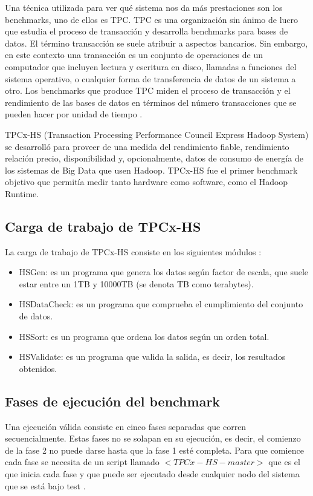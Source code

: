 \documentclass[10pt]{article}
\begin{document}
	Una técnica utilizada para ver qué sistema nos da más prestaciones son los benchmarks, uno de ellos es TPC. TPC es una organización sin ánimo de lucro que estudia el proceso de transacción y desarrolla benchmarks para bases de datos. El término transacción se suele atribuir a aspectos bancarios. Sin embargo, en este contexto una transacción es un conjunto de operaciones de un computador que incluyen lectura y escritura en disco, llamadas a funciones del sistema operativo, o cualquier forma de transferencia de datos de un sistema a otro. Los benchmarks que produce TPC miden el proceso de transacción y el rendimiento de las bases de datos en términos del número transacciones que se pueden hacer por unidad de tiempo \cite{intro-tpc}.
	
	TPCx-HS (Transaction Processing Performance Council Express Hadoop System) se desarrolló para proveer de una medida del rendimiento fiable, rendimiento relación precio, disponibilidad y, opcionalmente, datos de consumo de energía de los sistemas de Big Data que usen Hadoop. TPCx-HS fue el primer benchmark objetivo que permitía medir tanto hardware como software, como el Hadoop Runtime. \cite{info-tpc}
	
	\subsection{Carga de trabajo de TPCx-HS}
	
		La carga de trabajo de TPCx-HS consiste en los siguientes módulos \cite{tpcxhs}:
		
		\begin{itemize}
			\item HSGen: es un programa que genera los datos según factor de escala, que suele estar entre un 1TB y 10000TB (se denota TB como terabytes).
			\item HSDataCheck: es un programa que comprueba el cumplimiento del conjunto de datos.
			\item HSSort: es un programa que ordena los datos según un orden total.
			\item HSValidate: es un programa que valida la salida, es decir, los resultados obtenidos.
		\end{itemize}
	
	\subsection{Fases de ejecución del benchmark}
		Una ejecución válida consiste en cinco fases separadas que corren secuencialmente. Estas fases no se solapan en su ejecución, es decir, el comienzo de la fase 2 no puede darse hasta que la fase 1 esté completa. Para que comience cada fase se necesita de un script llamado $<TPCx-HS-master>$ que es el que inicia cada fase y que puede ser ejecutado desde cualquier nodo del sistema que se está bajo test \cite{tpcxhs}.
		
\end{document}
